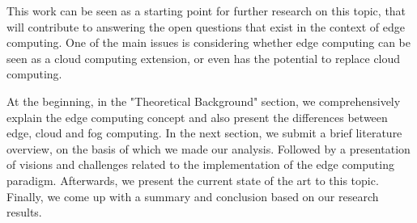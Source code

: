 This work can be seen as a starting point for further research on this topic, that will contribute to answering the open questions that exist in the context of edge computing. One of the main issues is considering whether edge computing can be seen as a cloud computing extension, or even has the potential to replace cloud computing.\par
At the beginning, in the "Theoretical Background" section, we comprehensively explain the edge computing concept and also present the differences between edge, cloud and fog computing. In the next section, we submit a brief literature overview, on the basis of which we made our analysis. Followed by a presentation of visions and challenges related to the implementation of the edge computing paradigm. Afterwards, we present the current state of the art to this topic. Finally, we come up with a summary and conclusion based on our research results.\par
